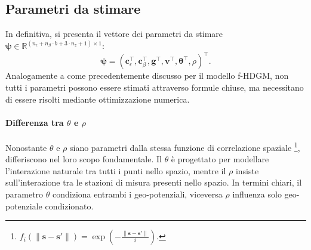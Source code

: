 \subsection[Parametri da stimare]{Parametri da stimare}
In definitiva, si presenta il vettore dei parametri da stimare $\boldsymbol{\psi}\in\mathbb{R}^{(n_\epsilon + n_\beta\cdot b + 3\cdot n_z+1)\times 1}$:
\begin{equation}
	\boldsymbol{\psi} = (\mathbf{c}_\epsilon^\top, \mathbf{c}_\beta^\top, \mathbf{g}^\top, \mathbf{v}^\top, \boldsymbol{\theta}^\top, \rho)^\top.
\end{equation}
Analogamente a come precedentemente discusso per il modello f-HDGM, non tutti i parametri possono essere stimati attraverso formule chiuse, ma necessitano di essere risolti mediante ottimizzazione numerica.

\paragraph[Differenza tra $\theta$ e $\rho$]{Differenza tra $\theta$ e $\rho$} Nonostante $\theta$ e $\rho$ siano parametri dalla stessa funzione di correlazione spaziale \footnote{$f_i(\|\mathbf{s} - \mathbf{s}'\|)=\exp(-\frac{\|\mathbf{s} - \mathbf{s}'\|}{i})$.}, differiscono nel loro scopo fondamentale. Il $\theta$ è progettato per modellare l'interazione naturale tra tutti i punti nello spazio, mentre il $\rho$ insiste sull'interazione tra le stazioni di misura presenti nello spazio. 
In termini chiari, il parametro $\theta$ condiziona entrambi i geo-potenziali, viceversa $\rho$ influenza solo geo-potenziale condizionato.

